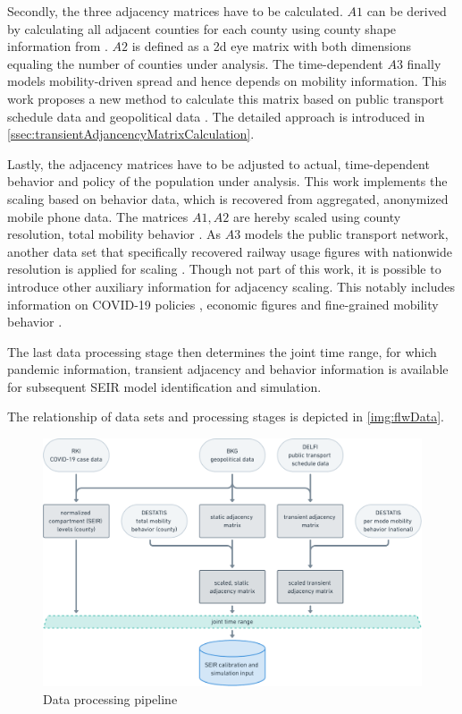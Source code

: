Secondly, the three adjacency matrices have to be calculated. $A1$ can be derived by calculating all adjacent counties for each county using county shape information from \cite{Verwaltungsgebiete2500002020}. $A2$ is defined as a 2d eye matrix with both dimensions equaling the number of counties under analysis. The time-dependent $A3$ finally models mobility-driven spread and hence depends on mobility information. This work proposes a new method to calculate this matrix based on public transport schedule data \cite{delfie.v.OpenDataOPNV2021} and geopolitical data \cite{Verwaltungsgebiete2500002020}. The detailed approach is introduced in \autoref{ssec:transientAdjancencyMatrixCalculation}.

Lastly, the adjacency matrices have to be adjusted to actual, time-dependent behavior and policy of the population under analysis. This work implements the scaling based on behavior data, which is recovered from aggregated, anonymized mobile phone data. The matrices $A1, A2$ are hereby scaled using county resolution, total mobility behavior \cite{statistischesbundesamtdestatisVeranderungsrateMobilitatGgu2021}. As $A3$ models the public transport network, another data set that specifically recovered railway usage figures with nationwide resolution is applied for scaling \cite{statistischesbundesamtdestatisVerkehrsmittelImFernverkehr2021}. Though not part of this work, it is possible to introduce other auxiliary information for adjacency scaling. This notably includes information on COVID-19 policies \cite{haleGlobalPanelDatabase2021}, economic figures \cite{statistischesbundesamtdestatisKonjunkturindikatoren} and fine-grained mobility behavior \cite{COVID19CommunityMobility}.

The last data processing stage then determines the joint time range, for which pandemic information, transient adjacency and behavior information is available for subsequent SEIR model identification and simulation.

The relationship of data sets and processing stages is depicted in \autoref{img:flwData}.

\begin{figure}[hbtp]
\centering 
\includegraphics[width=\linewidth]{img/FP_data-pipeline.pdf}
\caption{Data processing pipeline}
  \label{img:flwData}
\end{figure}

